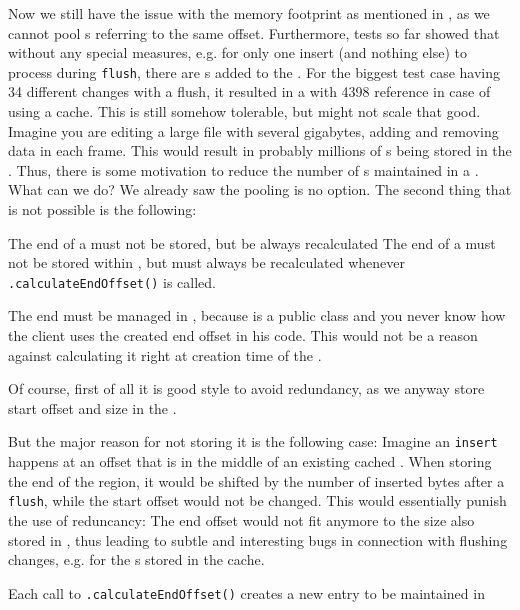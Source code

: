 Now we still have the issue with the memory footprint as mentioned in , as we cannot pool \IMediumReference{}s referring to the same offset. Furthermore, tests so far showed that without any special measures, e.g. for only one insert (and nothing else) to process during \texttt{flush}, there are \IMediumReference{}s added to the \MediumReferenceRepository{}. For the biggest test case having 34 different changes with a flush, it resulted in a \MediumReferenceRepository{} with 4398 reference in case of using a cache. This is still somehow tolerable, but might not scale that good. Imagine you are editing a large file with several gigabytes, adding and removing data in each frame. This would result in probably millions of \IMediumReference{}s being stored in the \MediumReferenceRepository{}. Thus, there is some motivation to reduce the number of \IMediumReference{}s maintained in a \MediumReferenceRepository{}. What can we do? We already saw the pooling is no option. The second thing that is not possible is the following:

{%
The end \IMediumReference{} of a \MediumRegion{} must not be stored, but be always recalculated
}
{%
The end \IMediumReference{} of a \MediumRegion{} must not be stored within \MediumRegion{}, but must always be recalculated whenever \MediumRegion{}\texttt{.calculateEndOffset()} is called. 
}
{%
The end \IMediumReference{} must be managed in \MediumReferenceRepository{}, because \MediumRegion{} is a public class and you never know how the client uses the created end offset in his code. This would not be a reason against calculating it right at creation time of the \MediumRegion{}.

Of course, first of all it is good style to avoid redundancy, as we anyway store start offset and size in the \MediumRegion{}. 

But the major reason for not storing it is the following case: Imagine an \texttt{insert} happens at an offset that is in the middle of an existing cached \MediumRegion{}. When storing the end \IMediumReference{} of the region, it would be shifted by the number of inserted bytes after a \texttt{flush}, while the start offset would not be changed. This would essentially punish the use of reduncancy: The end offset would not fit anymore to the size also stored in \MediumRegion{}, thus leading to subtle and interesting bugs in connection with flushing changes, e.g. for the \MediumRegion{}s stored in the cache.
}
{%
Each call to \MediumRegion{}\texttt{.calculateEndOffset()} creates a new entry to be maintained in \MediumReferenceRepository{}
}

